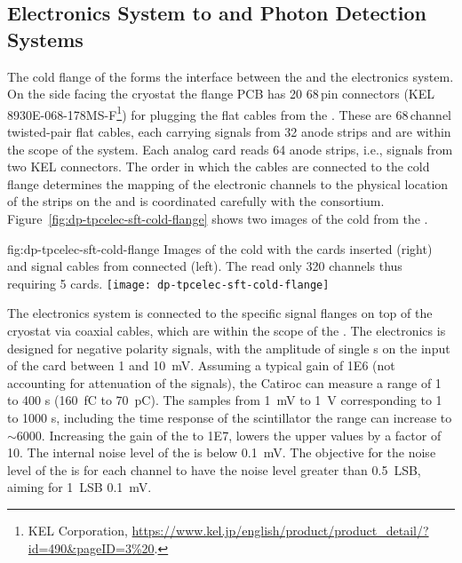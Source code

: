 \subsection{Electronics System to  and Photon Detection Systems}
\label{ssec:dp-tpcelec-intfc-crppmt}

The cold \fdth flange of the  forms the interface between the  and the  electronics system. On the side facing the cryostat the flange PCB has \num{20} \num{68}\,pin connectors (KEL 8930E-068-178MS-F\footnote{KEL Corporation\texttrademark{}, \url{https://www.kel.jp/english/product/product_detail/?id=490\&pageID=3\%20}.}) for plugging the flat cables from the . These are \num{68}\,channel twisted-pair flat cables, each carrying signals from \num{32} anode strips and are within the scope of the  system. Each analog  card reads \num{64} anode strips, i.e., signals from two KEL connectors. The order in which the cables are connected to the cold flange determines the mapping of the electronic channels to the physical location of the strips on the  and is coordinated carefully with the  consortium. Figure~\ref{fig:dp-tpcelec-sft-cold-flange} shows two images of the cold \fdth from the .

\begin{dunefigure}{fig:dp-tpcelec-sft-cold-flange}
{Images of the   cold \fdth with the  cards inserted (right) and signal cables from  connected (left). The   read only \num{320} channels thus requiring \num{5}  cards.}
\texttt{[image: dp-tpcelec-sft-cold-flange]}
\end{dunefigure}

The  electronics system is connected to the specific  signal \fdth flanges on top of the cryostat via coaxial cables, which are within the scope of the .
The  electronics is designed for negative polarity  signals, with the amplitude of single \phel{}s on the input of the card between \num{1} and \SI{10}{\milli\volt}. Assuming a typical  gain of \num{1E6} (not accounting for attenuation of the signals), the Catiroc  can measure a range of \num{1} to \num{400} \phel{}s (\SI{160}{\femto\coulomb} to \SI{70}{\pico\coulomb}). The  samples from \SI{1}{\milli\volt} to \SI{1}{\volt} corresponding to \num{1} to \num{1000} \phel{}s, including the time response of the scintillator the range can increase to $\sim$\num{6000}. Increasing the gain of the  to \num{1E7}, lowers the upper values by a factor of 10. The internal noise level of the  is below \SI{0.1}{\milli\volt}. The objective for the noise level of the  is for each channel to have the \rms noise level greater than \SI{0.5}{LSB}, aiming for \SI{1}{LSB} \SI{0.1}{\milli\volt}.


